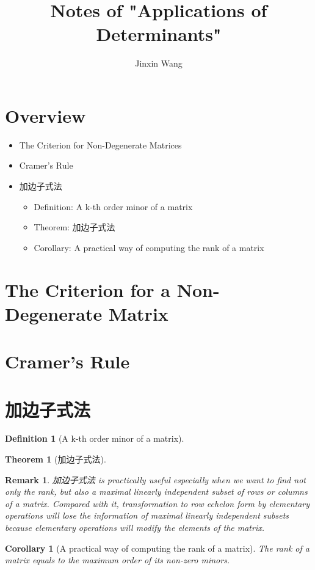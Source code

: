 \documentclass[onecolumn]{ctexart}
\title{Notes of "Applications of Determinants"}
\author{Jinxin Wang}
\date{}
\newtheorem{definition}{Definition}
\newtheorem{theorem}{Theorem}
\newtheorem{corollary}{Corollary}
\newtheorem{remark}{Remark}
\begin{document}
\maketitle

\section{Overview}
\begin{itemize}
  \item The Criterion for Non-Degenerate Matrices
  \item Cramer's Rule
  \item 加边子式法
  \begin{itemize}
    \item Definition: A k-th order minor of a matrix
    \item Theorem: 加边子式法
    \item Corollary: A practical way of computing the rank of a matrix
  \end{itemize}
\end{itemize}

\section{The Criterion for a Non-Degenerate Matrix}

\section{Cramer's Rule}

\section{加边子式法}

\begin{definition}[A k-th order minor of a matrix]
  
\end{definition}

\begin{theorem}[加边子式法]
  
\end{theorem}
\begin{remark}
  加边子式法 is practically useful especially when we want to find not only the rank, 
  but also a maximal linearly independent subset of rows or columns of a matrix. 
  Compared with it, transformation to row echelon form by elementary operations 
  will lose the information of maximal linearly independent subsets because 
  elementary operations will modify the elements of the matrix.
\end{remark}

\begin{corollary}[A practical way of computing the rank of a matrix]
  The rank of a matrix equals to the maximum order of its non-zero minors.
\end{corollary}
\end{document}
